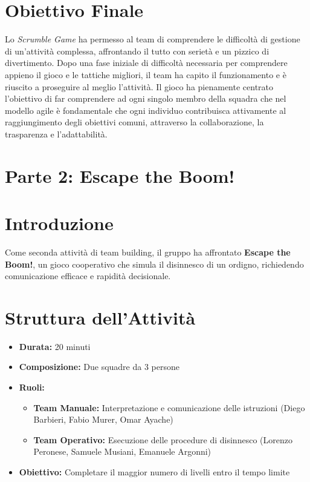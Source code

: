\documentclass{article}
\begin{document}
\section*{Obiettivo Finale}
Lo \textit{Scrumble Game} ha permesso al team di comprendere le difficoltà di gestione di un'attività complessa, affrontando il tutto con serietà e un pizzico di divertimento. 
Dopo una fase iniziale di difficoltà necessaria per comprendere appieno il gioco e le tattiche migliori, il team ha capito il funzionamento e è riuscito a proseguire al meglio l'attività.
Il gioco ha pienamente centrato l'obiettivo di far comprendere ad ogni singolo membro della squadra che nel modello agile è fondamentale che ogni individuo contribuisca attivamente al raggiungimento degli obiettivi comuni, attraverso la collaborazione, la trasparenza e l'adattabilità.


\section*{Parte 2: Escape the Boom!}

\section*{Introduzione}
Come seconda attività di team building, il gruppo ha affrontato \textbf{Escape the Boom!}, un gioco cooperativo che simula il disinnesco di un ordigno, richiedendo comunicazione efficace e rapidità decisionale.

\section*{Struttura dell'Attività}
\begin{itemize}
    \item \textbf{Durata:} 20 minuti
    \item \textbf{Composizione:} Due squadre da 3 persone
    \item \textbf{Ruoli:}
    \begin{itemize}
        \item \textbf{Team Manuale:} Interpretazione e comunicazione delle istruzioni
        (Diego Barbieri, Fabio Murer, Omar Ayache)
        \item \textbf{Team Operativo:} Esecuzione delle procedure di disinnesco
        (Lorenzo Peronese, Samuele Musiani, Emanuele Argonni)
    \end{itemize}
    \item \textbf{Obiettivo:} Completare il maggior numero di livelli entro il tempo limite
\end{itemize}
\end{document}
